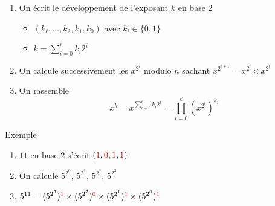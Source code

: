 \begin{frame}

\begin{enumerate}
  \item On écrit le développement de l'exposant $k$ en base $2$ 
  \begin{itemize}
    \item $(k_\ell, \ldots, k_2, k_1, k_0)$ avec $k_i \in \{0,1\}$
    
    \item $k = \sum_{i=0}^\ell k_i 2^i$

  \end{itemize}


\pause

  \item On calcule successivement les $x^{2^i}$ modulo $n$ sachant $x^{2^{i+1}} = x^{2^i} \times x^{2^i}$

\pause
  
  \item On rassemble   
  $$x^k = x^{\sum_{i=0}^\ell k_i 2^i} = \prod_{i=0}^\ell (x^{2^i})^{k_i}$$
  
\end{enumerate}

\pause
\bigskip

 Exemple
 \begin{enumerate}
   \item $11$ en base $2$ s'écrit $({\color{red}1},{\color{red}0},{\color{red}1},{\color{red}1})$
   \pause
   \item On calcule $5^{2^0}$, $5^{2^1}$, $5^{2^2}$, $5^{2^3}$   
   \pause
   \item $5^{11} = (5^{2^3})^{{\color{red}1}} \times (5^{2^2})^{{\color{red}0}}
\times (5^{2^1})^{{\color{red}1}} \times (5^{2^0})^{{\color{red}1}}$
 \end{enumerate}

\end{frame}


